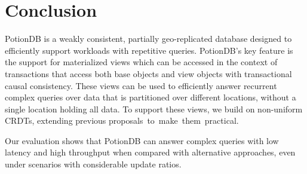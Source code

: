 \documentclass[sigplan,twocolumn,review,anonymous]{acmart}
\begin{document}

\section{Conclusion}
\label{sec:conclusion}

PotionDB is a weakly consistent, partially geo-replicated database designed to efficiently support
workloads with repetitive queries. 
PotionDB's key feature is the support for materialized views which can be accessed in the context of 
transactions that access both base objects and view objects with  
transactional causal consistency.
These views can be used to efficiently answer recurrent complex queries over data that is partitioned
over different locations, without a single location holding all data.
To support these views, we build on non-uniform CRDTs, extending previous \mbox{proposals to make them practical. }

Our evaluation shows that PotionDB can answer complex queries with low latency and high throughput when 
compared with alternative approaches, even under scenarios with considerable update ratios.
\end{document}

